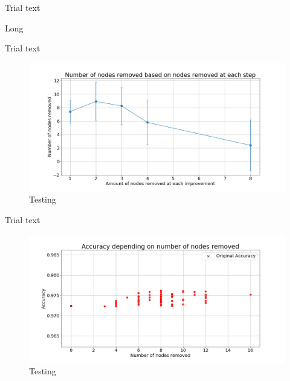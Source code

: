 \documentclass[UKenglish]{ifimaster}
\begin{document}
            Trial text

            \begin{table}[h!]
                \centering
                \resizebox{\textwidth}{!}{}
                \caption[Short]{Long}
                \label{tab:nr_rnd_rem_imp_mnist}
            \end{table}

            Trial text

            \begin{figure}[h!]\centering
                \includegraphics[width=\textwidth]{Num_rem_vs_size_removed_mnist.png}
                \caption[Short title]{Testing}
                \label{fig:num_rem_rn_imp_mnist}
            \end{figure}

            Trial text

            \begin{figure}[h!]\centering
                \includegraphics[width=\textwidth]{Accuracy_vs_nodes_removed_mnist.png}
                \caption[Short title]{Testing}
                \label{fig:acc_rn_imp_mnist}
            \end{figure}
\end{document}
